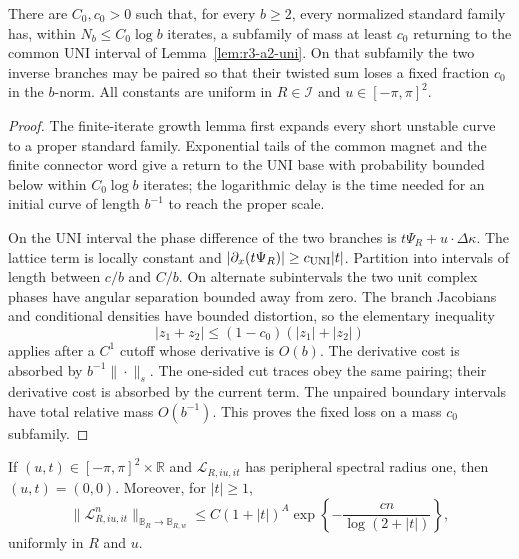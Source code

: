 \begin{lemma}
\label{lem:r4-a2-dolgopyat-block}
There are \(C_0,c_0>0\) such that, for every \(b\ge2\), every normalized
standard family has, within
\(N_b\le C_0\log b\) iterates, a subfamily of mass at least \(c_0\) returning
to the common UNI interval of Lemma~\ref{lem:r3-a2-uni}.  On that subfamily the
two inverse branches may be paired so that their twisted sum loses a fixed
fraction \(c_0\) in the \(b\)-norm.  All constants are uniform in
\(R\in\mathcal I\) and \(u\in[-\pi,\pi]^2\).
\end{lemma}

\begin{proof}
The finite-iterate growth lemma first expands every short unstable curve to a
proper standard family.  Exponential tails of the common magnet and the finite
connector word give a return to the UNI base with probability bounded below
within \(C_0\log b\) iterates; the logarithmic delay is the time needed for an
initial curve of length \(b^{-1}\) to reach the proper scale.

On the UNI interval the phase difference of the two branches is
\(t\Psi_R+u\cdot\Delta\kappa\).  The lattice term is locally constant and
\(|\partial_x(t\Psi_R)|\ge c_{\rm UNI}|t|\).  Partition into intervals of
length between \(c/b\) and \(C/b\).  On alternate subintervals the two unit
complex phases have angular separation bounded away from zero.  The branch
Jacobians and conditional densities have bounded distortion, so the elementary
inequality
\[
 |z_1+z_2|\le(1-c_0)(|z_1|+|z_2|)
\]
applies after a \(C^1\) cutoff whose derivative is \(O(b)\).  The derivative
cost is absorbed by \(b^{-1}\|\cdot\|_s\).  The one-sided cut traces obey the
same pairing; their derivative cost is absorbed by the current term.  The
unpaired boundary intervals have total relative mass \(O(b^{-1})\).  This
proves the fixed loss on a mass \(c_0\) subfamily.
\end{proof}

\begin{theorem}
\label{thm:r3-a2-high}
If \((u,t)\in[-\pi,\pi]^2\times\mathbb R\) and
\(\mathcal L_{R,iu,it}\) has peripheral spectral radius one, then
\((u,t)=(0,0)\).  Moreover, for \(|t|\ge1\),
\[
 \|\mathcal L_{R,iu,it}^n\|_{\mathbb B_R\to\mathbb B_{R,w}}
 \le C(1+|t|)^A
 \exp\left\{-\frac{cn}{\log(2+|t|)}\right\},
\]
uniformly in \(R\) and \(u\).
\end{theorem}

